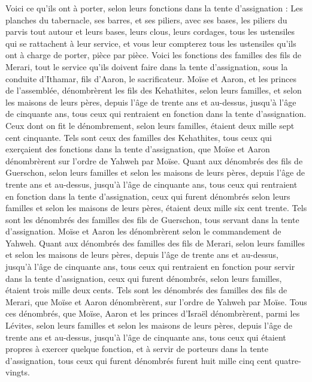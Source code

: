 \begin{multicols}{2}
Voici ce qu'ils ont à porter, selon leurs fonctions dans la tente d'assignation : Les planches du tabernacle, ses barres, et ses piliers, avec ses bases,
les piliers du parvis tout autour et leurs bases, leurs clous, leurs cordages, tous les ustensiles qui se rattachent à leur service, et vous leur compterez tous les ustensiles qu'ils ont à charge de porter, pièce par pièce.
Voici les fonctions des familles des fils de Merari, tout le service qu’ils doivent faire dans la tente d'assignation, sous la conduite d'Ithamar, fils d'Aaron, le sacrificateur.
Moïse et Aaron, et les princes de l'assemblée, dénombrèrent les fils des Kehathites, selon leurs familles, et selon les maisons de leurs pères,
depuis l'âge de trente ans et au-dessus, jusqu'à l'âge de cinquante ans, tous ceux qui rentraient en fonction dans la tente d'assignation.
Ceux dont on fit le dénombrement, selon leurs familles, étaient deux mille sept cent cinquante.
Tels sont ceux des familles des Kehathites, tous ceux qui exerçaient des fonctions dans la tente d'assignation, que Moïse et Aaron dénombrèrent sur l’ordre de Yahweh par Moïse.
Quant aux dénombrés des fils de Guerschon, selon leurs familles et selon les maisons de leurs pères,
depuis l'âge de trente ans et au-dessus, jusqu'à l'âge de cinquante ans, tous ceux qui rentraient en fonction dans la tente d'assignation,
ceux qui furent dénombrés selon leurs familles et selon les maisons de leurs pères, étaient deux mille six cent trente.
Tels sont les dénombrés des familles des fils de Guerschon, tous servant dans la tente d'assignation. Moïse et Aaron les dénombrèrent selon le commandement de Yahweh.
Quant aux dénombrés des familles des fils de Merari, selon leurs familles et selon les maisons de leurs pères,
depuis l'âge de trente ans et au-dessus, jusqu'à l'âge de cinquante ans, tous ceux qui rentraient en fonction pour servir dans la tente d'assignation,
ceux qui furent dénombrés, selon leurs familles, étaient trois mille deux cents.
Tels sont les dénombrés des familles des fils de Merari, que Moïse et Aaron dénombrèrent, sur l’ordre de Yahweh par Moïse.
Tous ces dénombrés, que Moïse, Aaron et les princes d'Israël dénombrèrent, parmi les Lévites, selon leurs familles et selon les maisons de leurs pères,
depuis l'âge de trente ans et au-dessus, jusqu'à l'âge de cinquante ans, tous ceux qui étaient propres à exercer quelque fonction, et à servir de porteurs dans la tente d'assignation,
tous ceux qui furent dénombrés furent huit mille cinq cent quatre-vingts.

\end{multicols}
